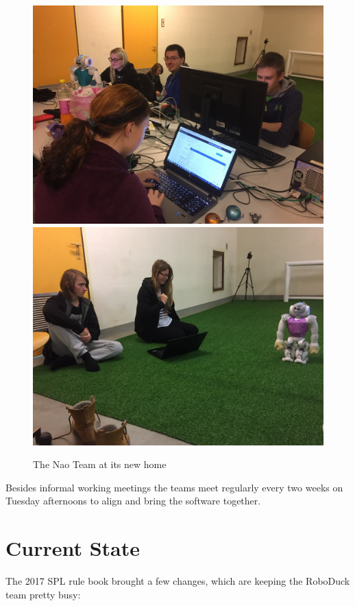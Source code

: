 \documentclass[11pt]{article}
\begin{document}
\begin{figure}
\begin{center}
\includegraphics[scale=.063]{img/MotionTeam.jpg}
\includegraphics[scale=.063]{img/VisionTeam.jpg}
\end{center}
\caption{The Nao Team at its new home}\label{fig:motionteam}
\end{figure}

Besides informal working meetings the teams meet regularly every two weeks on Tuesday afternoons to align and bring the software together.

\section{Current State}\label{sec:state}
The 2017 SPL rule book brought a few changes, which are keeping the RoboDuck team pretty busy:
\end{document}
